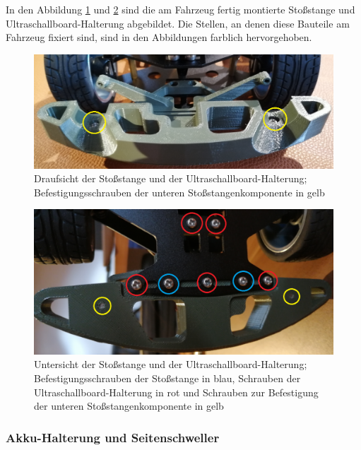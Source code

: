 In den Abbildung \ref{fig:StossstangeUltraschallHalterungMontage01} und \ref{fig:StossstangeUltraschallHalterungMontage02} sind die am Fahrzeug fertig montierte Stoßstange und Ultraschallboard-Halterung abgebildet. Die Stellen, an denen diese Bauteile am Fahrzeug fixiert sind, sind in den Abbildungen farblich hervorgehoben. 

\begin{figure}[H] %
\includegraphics[width=.78\textwidth]{sec2/images/3DAnbaukomponenten/Montagebilder/StossstangeUltraschallHalterungMontage01} 
\centering
\captionsetup{width=.95\textwidth}
\caption[Draufsicht der Stoßstange und der Ultraschallboard-Halterung]{Draufsicht der Stoßstange und der Ultraschallboard-Halterung; Befestigungsschrauben der unteren Stoßstangenkomponente in gelb}\centering
\label{fig:StossstangeUltraschallHalterungMontage01}
\end{figure}

\begin{figure}[H] %
\includegraphics[width=.7\textwidth]{sec2/images/3DAnbaukomponenten/Montagebilder/StossstangeUltraschallHalterungMontage02} 
\centering
\captionsetup{width=.95\textwidth}
\caption[Untersicht der Stoßstange und der Ultraschallboard-Halterung]{Untersicht der Stoßstange und der Ultraschallboard-Halterung; Befestigungsschrauben der Stoßstange in blau, Schrauben der Ultraschallboard-Halterung in rot und Schrauben zur Befestigung der unteren Stoßstangenkomponente in gelb}\centering
\label{fig:StossstangeUltraschallHalterungMontage02}
\end{figure}

\subsubsection{Akku-Halterung und Seitenschweller}\label{Sec2Sub2SubSub2}

